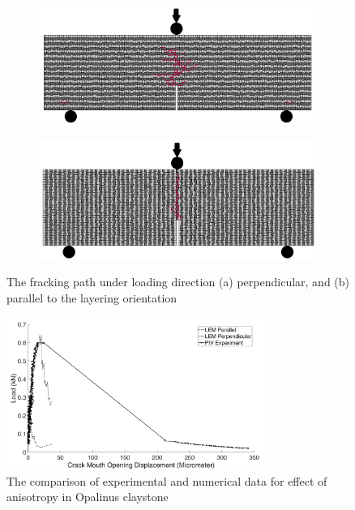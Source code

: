 \begin{figure}[!ht]
\centering
\begin{subfigure}[b]{0.55\textwidth}
\includegraphics[width=1\linewidth]{figures/Amir_ME1_LEM_Perpendicular.png}
\subcaption{}
\label{fig:Amir_ME1_LEM_Perpendicular}
\end{subfigure}
\begin{subfigure}[b]{0.55\textwidth}
\includegraphics[width=1\linewidth]{figures/Amir_ME1_LEM_Parallel.png}
\subcaption{}
\label{fig:Amir_ME1_LEM_Parallel}
\end{subfigure}
\caption{The fracking path under loading direction (a) perpendicular, and (b) parallel to the layering orientation}
\end{figure}

\begin{figure}[!ht]
\centering
\includegraphics[width=0.75\textwidth]{figures/Amir_ME1_LEM_Claystone.png}
\caption{The comparison of experimental and numerical data for effect of anisotropy in Opalinus claystone} 
\label{fig:Amir_ME1_LEM_Claystone}
\end{figure}


